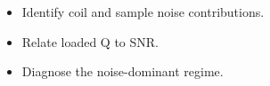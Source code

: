 \begin{objectives}
\begin{itemize}[leftmargin=1.4em,itemsep=2pt]
\item Identify coil and sample noise contributions.
\item Relate loaded Q to SNR.
\item Diagnose the noise-dominant regime.
\end{itemize}
\end{objectives}
